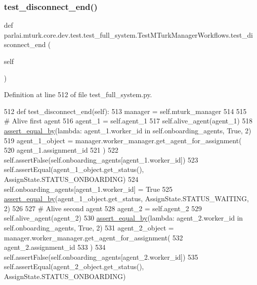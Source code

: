 \subsubsection{\texorpdfstring{test\+\_\+disconnect\+\_\+end()}{test\_disconnect\_end()}}
{\footnotesize\ttfamily def parlai.\+mturk.\+core.\+dev.\+test.\+test\+\_\+full\+\_\+system.\+Test\+M\+Turk\+Manager\+Workflows.\+test\+\_\+disconnect\+\_\+end (\begin{DoxyParamCaption}\item[{}]{self }\end{DoxyParamCaption})}



Definition at line 512 of file test\+\_\+full\+\_\+system.\+py.


\begin{DoxyCode}
512     \textcolor{keyword}{def }test\_disconnect\_end(self):
513         manager = self.mturk\_manager
514 
515         \textcolor{comment}{# Alive first agent}
516         agent\_1 = self.agent\_1
517         self.alive\_agent(agent\_1)
518         \hyperlink{namespaceparlai_1_1mturk_1_1core_1_1test_1_1test__full__system_a0b463246d35658a2e422010f13dcf819}{assert\_equal\_by}(\textcolor{keyword}{lambda}: agent\_1.worker\_id \textcolor{keywordflow}{in} self.onboarding\_agents, \textcolor{keyword}{True}, 2)
519         agent\_1\_object = manager.worker\_manager.get\_agent\_for\_assignment(
520             agent\_1.assignment\_id
521         )
522         self.assertFalse(self.onboarding\_agents[agent\_1.worker\_id])
523         self.assertEqual(agent\_1\_object.get\_status(), AssignState.STATUS\_ONBOARDING)
524         self.onboarding\_agents[agent\_1.worker\_id] = \textcolor{keyword}{True}
525         \hyperlink{namespaceparlai_1_1mturk_1_1core_1_1test_1_1test__full__system_a0b463246d35658a2e422010f13dcf819}{assert\_equal\_by}(agent\_1\_object.get\_status, AssignState.STATUS\_WAITING, 2)
526 
527         \textcolor{comment}{# Alive second agent}
528         agent\_2 = self.agent\_2
529         self.alive\_agent(agent\_2)
530         \hyperlink{namespaceparlai_1_1mturk_1_1core_1_1test_1_1test__full__system_a0b463246d35658a2e422010f13dcf819}{assert\_equal\_by}(\textcolor{keyword}{lambda}: agent\_2.worker\_id \textcolor{keywordflow}{in} self.onboarding\_agents, \textcolor{keyword}{True}, 2)
531         agent\_2\_object = manager.worker\_manager.get\_agent\_for\_assignment(
532             agent\_2.assignment\_id
533         )
534         self.assertFalse(self.onboarding\_agents[agent\_2.worker\_id])
535         self.assertEqual(agent\_2\_object.get\_status(), AssignState.STATUS\_ONBOARDING)

\end{DoxyCode}

